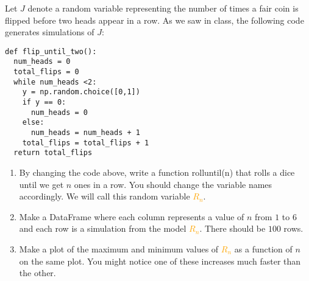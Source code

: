 \begin{exercise}
Let $J$ denote a random variable representing the number of times a fair coin is flipped before two heads appear in a row. As we saw in class, the following code generates simulations of $J$:
\begin{Verbatim}
def flip_until_two():
  num_heads = 0
  total_flips = 0
  while num_heads <2:
    y = np.random.choice([0,1])
    if y == 0:
      num_heads = 0
    else:
      num_heads = num_heads + 1
    total_flips = total_flips + 1
  return total_flips
\end{Verbatim}

\begin{enumerate}[label=(\alph*)]
\item  By changing the code above, write a function rolluntil(n) that rolls a dice until we
get $n$ ones in a row. You should change the variable names accordingly. We will call this random variable \textcolor{orange}{$R_n$}.
\item  Make a DataFrame where each column represents a value of $n$ from $1$ to $6$ and each row is a simulation from the model  \textcolor{orange}{$R_n$}. There should be $100$ rows.
\item Make a plot of the maximum and minimum values of \textcolor{orange}{$R_n$} as a function of $n$ on the same plot. You might notice one of these increases much faster than the other.  
\end{enumerate}
\end{exercise}


